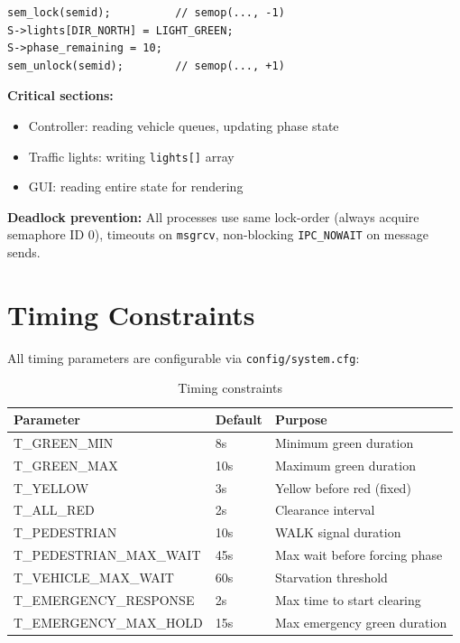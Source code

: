 \documentclass[11pt,a4paper]{article}
\begin{document}
\begin{lstlisting}
sem_lock(semid);          // semop(..., -1)
S->lights[DIR_NORTH] = LIGHT_GREEN;
S->phase_remaining = 10;
sem_unlock(semid);        // semop(..., +1)
\end{lstlisting}

\textbf{Critical sections:}
\begin{itemize}[noitemsep]
    \item Controller: reading vehicle queues, updating phase state
    \item Traffic lights: writing \texttt{lights[]} array
    \item GUI: reading entire state for rendering
\end{itemize}

\textbf{Deadlock prevention:} All processes use same lock-order (always acquire semaphore ID 0), timeouts on \texttt{msgrcv}, non-blocking \texttt{IPC\_NOWAIT} on message sends.

\newpage
\section{Timing Constraints}

All timing parameters are configurable via \texttt{config/system.cfg}:

\begin{table}[H]
\centering
\begin{tabular}{|l|l|l|}
\hline
\textbf{Parameter} & \textbf{Default} & \textbf{Purpose} \\ \hline
T\_GREEN\_MIN & 8s & Minimum green duration \\ \hline
T\_GREEN\_MAX & 10s & Maximum green duration \\ \hline
T\_YELLOW & 3s & Yellow before red (fixed) \\ \hline
T\_ALL\_RED & 2s & Clearance interval \\ \hline
T\_PEDESTRIAN & 10s & WALK signal duration \\ \hline
T\_PEDESTRIAN\_MAX\_WAIT & 45s & Max wait before forcing phase \\ \hline
T\_VEHICLE\_MAX\_WAIT & 60s & Starvation threshold \\ \hline
T\_EMERGENCY\_RESPONSE & 2s & Max time to start clearing \\ \hline
T\_EMERGENCY\_MAX\_HOLD & 15s & Max emergency green duration \\ \hline
\end{tabular}
\caption{Timing constraints}
\end{table}
\end{document}
